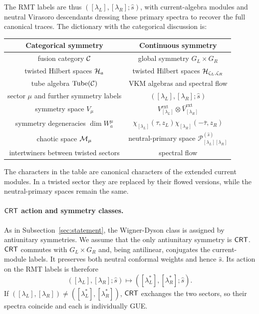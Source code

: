 \documentclass[11pt]{article}
\numberwithin{equation}{section}
\begin{document}
The RMT labels are thus $([\lambda_L],[\lambda_R];\hat s)$, with current-algebra modules and neutral Virasoro descendants dressing these primary spectra to recover the full canonical traces. The dictionary with the categorical discussion is:
\begin{center}
\begin{tabular}{c|c}
Categorical symmetry & Continuous symmetry \\
\hline
fusion category $\mathcal C$ & global symmetry $G_L\times G_R$ \\
twisted Hilbert spaces $\mathcal H_a$ & twisted Hilbert spaces $\mathcal H_{\zeta_L,\zeta_R}$ \\
tube algebra $\mathrm{Tube}(\mathcal C)$ & VKM algebras and spectral flow \\
sector $\mu$ and further symmetry labels & $([\lambda_L],[\lambda_R];\hat s)$ \\
symmetry space $V_\mu$ & $V^{\mathrm{ext}}_{[\lambda_L]}\otimes\bar V^{\mathrm{ext}}_{[\lambda_R]}$ \\
symmetry degeneracies $\dim W_a^\mu$ & $\chi_{[\lambda_L]}(\tau,z_L)\chi_{[\lambda_R]}(-\bar\tau,z_R)$ \\
chaotic space $\mathcal{M}_\mu$ & neutral-primary space $\mathcal P^{(\hat s)}_{[\lambda_L][\lambda_R]}$ \\
intertwiners between twisted sectors & spectral flow
\end{tabular}
\end{center}
The characters in the table are canonical characters of the extended current modules. In a twisted sector they are replaced by their flowed versions, while the neutral-primary spaces remain the same.

\paragraph{$\mathsf{CRT}$ action and symmetry classes.}
As in Subsection~\ref{sec:statement}, the Wigner-Dyson class is assigned by antiunitary symmetries.
We assume that the only antiunitary symmetry is $\mathsf{CRT}$. $\mathsf{CRT}$ commutes with $G_L\times G_R$ and, being antilinear, conjugates the current-module labels. It preserves both neutral conformal weights and hence $\hat s$. Its action on the RMT labels is therefore
\begin{equation}
([\lambda_L],[\lambda_R];\hat s)
 \longmapsto([\lambda_L^*],[\lambda_R^*];\hat s).
\label{eq:continuous-CRT-labels}
\end{equation}
If $([\lambda_L],[\lambda_R]) \neq
 ([\lambda_L^*],[\lambda_R^*])$, $\mathsf{CRT}$ exchanges the two sectors, so their spectra coincide and
each is individually GUE.
\end{document}
